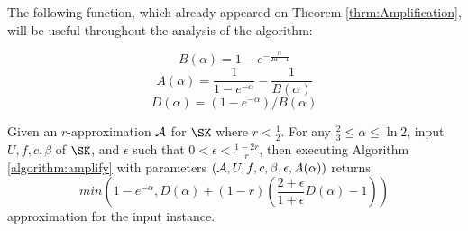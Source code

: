 The following function, which already appeared on Theorem \ref{thrm:Amplification}, will be useful throughout the analysis of the algorithm:

$$ B(\alpha)=1-e^{-\frac{\alpha}{2\alpha - 1}}$$
$$ A(\alpha) = \frac{1}{1-e^{-\alpha}}-\frac{1}{B(\alpha)}$$
 $$D(\alpha)=(1-e^{-\alpha})/B(\alpha)$$
 
 \begin{lemma}
 	\label{lemma:amplification}
 	Given an $r$-approximation $\mathcal{A}$ for $\SK$ where $r<\frac{1}{2}$.
 	For any $\frac{2}{3}\leq \alpha \leq  \ln 2$, input $U,f,c,\beta$ of $\SK$, 
 	and $\epsilon$ such that $0<\epsilon< \frac{1-2r}{r}$, then executing 
 	Algorithm \ref{algorithm:amplify}  with parameters 
 	$(\mathcal{A}, U, f, c, \beta, \epsilon, A(\alpha))$ returns
 	$$min\left(1-e^{-\alpha}, D(\alpha) + (1-r) \left( \frac{2+\epsilon}{1+\epsilon} D(\alpha) -1 \right) \right)$$
 	approximation for the input instance. 
 \end{lemma}



